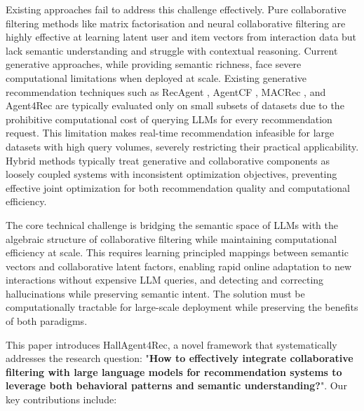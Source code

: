 \documentclass[acmsmall]{acmart}
\begin{document}
Existing approaches fail to address this challenge effectively. Pure collaborative filtering methods like matrix factorisation \cite{koren2009matrix} and neural collaborative filtering \cite{he2017neural} are highly effective at learning latent user and item vectors from interaction data but lack semantic understanding and struggle with contextual reasoning. Current generative approaches, while providing semantic richness, face severe computational limitations when deployed at scale. Existing generative recommendation techniques such as RecAgent \cite{wang2025user}, AgentCF \cite{zhang2024agentcf}, MACRec \cite{wang2024macrec}, and Agent4Rec \cite{zhang2024generative} are typically evaluated only on small subsets of datasets due to the prohibitive computational cost of querying LLMs for every recommendation request. This limitation makes real-time recommendation infeasible for large datasets with high query volumes, severely restricting their practical applicability. Hybrid methods \cite{sun2021bert4rec, wu2024llm} typically treat generative and collaborative components as loosely coupled systems with inconsistent optimization objectives, preventing effective joint optimization for both recommendation quality and computational efficiency.

The core technical challenge is bridging the semantic space of LLMs with the algebraic structure of collaborative filtering while maintaining computational efficiency at scale. This requires learning principled mappings between semantic vectors and collaborative latent factors, enabling rapid online adaptation to new interactions without expensive LLM queries, and detecting and correcting hallucinations while preserving semantic intent. The solution must be computationally tractable for large-scale deployment while preserving the benefits of both paradigms.

This paper introduces HallAgent4Rec, a novel framework that systematically addresses the research question: "\textbf{How to effectively integrate collaborative filtering with large language models for recommendation systems to leverage both behavioral patterns and semantic understanding?}". Our key contributions include:
\end{document}
